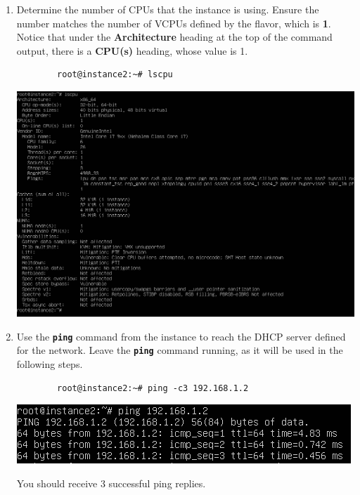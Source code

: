 \documentclass[letterpaper, 12pt]{article}
\begin{document}
\begin{enumerate}
    \item Determine the number of CPUs that the instance is using. Ensure the number matches the number of VCPUs defined
    by the flavor, which is \textbf{1}. Notice that under the \textbf{Architecture} heading at the top of the command
    output, there is a \textbf{CPU(s)} heading, whose value is 1.
    \begin{lstlisting}
        root@instance2:~# lscpu
    \end{lstlisting}

    \begin{center}
        \includegraphics[width=\linewidth]{images/part5/step9.png}
    \end{center}

    \item Use the \textbf{\texttt{ping}} command from the instance to reach the DHCP server defined for the network.
    Leave the \textbf{\texttt{ping}} command running, as it will be used in the following steps.
    \begin{lstlisting}
        root@instance2:~# ping -c3 192.168.1.2
    \end{lstlisting}

    \begin{center}
        \includegraphics[width=\linewidth]{images/part5/step10.png}
    \end{center}

    \begin{notebox}
        You should receive 3 successful ping replies.
    \end{notebox}


\end{enumerate}
\end{document}
